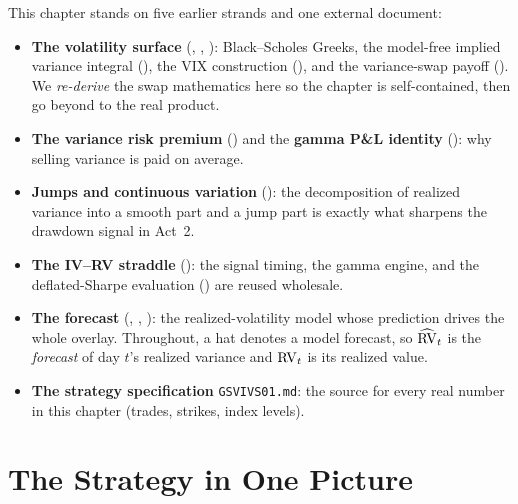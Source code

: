 \begin{prereq}[Background]
This chapter stands on five earlier strands and one external document:
\begin{itemize}
  \item \textbf{The volatility surface} (, , ): Black--Scholes Greeks, the model-free implied variance integral (), the VIX construction (), and the variance-swap payoff (). We \emph{re-derive} the swap mathematics here so the chapter is self-contained, then go beyond  to the real product.
  \item \textbf{The variance risk premium} () and the \textbf{gamma P\&L identity} (): why selling variance is paid on average.
  \item \textbf{Jumps and continuous variation} (): the decomposition of realized variance into a smooth part and a jump part is exactly what sharpens the drawdown signal in Act~2.
  \item \textbf{The IV--RV straddle} (): the signal timing, the gamma engine, and the deflated-Sharpe evaluation () are reused wholesale.
  \item \textbf{The forecast} (, , ): the realized-volatility model whose prediction drives the whole overlay. Throughout, a hat denotes a model forecast, so $\widehat{\operatorname{RV}}_t$ is the \emph{forecast} of day $t$'s realized variance and $\operatorname{RV}_t$ is its realized value.
  \item \textbf{The strategy specification} \texttt{GSVIVS01.md}: the source for every real number in this chapter (trades, strikes, index levels).
\end{itemize}
\end{prereq}

\section{The Strategy in One Picture}
\label{sec:gsvivs:picture}

